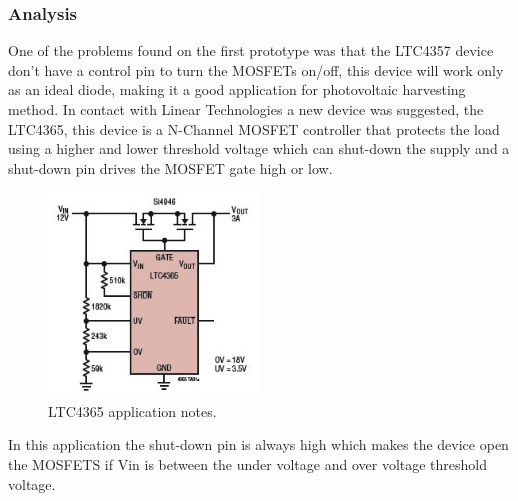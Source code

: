 \subsubsection{Analysis}
%
%
%
One of the problems found on the first prototype was that the LTC4357 device don't have a control pin to turn the MOSFETs on/off, this device will work only as an ideal diode, making it a good application for photovoltaic harvesting method.
In contact with Linear Technologies a new device was suggested, the LTC4365, this device is a N-Channel MOSFET controller that protects the load using a higher and lower threshold voltage which can shut-down the supply and a shut-down pin drives the MOSFET gate high or low.

\begin{figure}[H]
	\begin{centering}
		\includegraphics[width=0.5\textwidth]{images/ltc4365.png}
		\caption{LTC4365 application notes.}
	\end{centering}
\end{figure}
In this application the shut-down pin is always high which makes the device open the MOSFETS if Vin is between the under voltage and over voltage threshold voltage.

